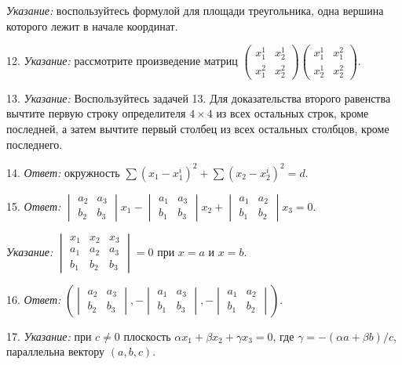 	\textit{Указание:} воспользуйтесь формулой для площади треугольника, одна вершина которого лежит в начале координат.

	12. \textit{Указание:} рассмотрите произведение матриц $\begin{pmatrix} x^1_1 & x^1_2 \\ x^2_1 & x^2_2 \end{pmatrix} \begin{pmatrix} x^1_1 & x^2_1 \\ x^1_2 & x^2_2 \end{pmatrix}$.

	13. \textit{Указание:} Воспользуйтесь задачей 13. Для доказательства второго равенства вычтите первую строку определителя $4 \times 4$ из всех остальных строк, кроме последней, а затем вычтите первый столбец из всех остальных столбцов, кроме последнего.

	14. \textit{Ответ:} окружность $\sum (x_1 - x^i_1)^2 + \sum (x_2 - x^i_2)^2 = d$.

	15. \textit{Ответ:} $\begin{vmatrix} a_2 & a_3 \\ b_2 & b_3 \end{vmatrix} x_1 - \begin{vmatrix} a_1 & a_3 \\ b_1 & b_3 \end{vmatrix} x_2 + \begin{vmatrix} a_1 & a_2 \\ b_1 & b_2 \end{vmatrix} x_3 = 0$.

	\textit{Указание:} $\begin{vmatrix} x_1 & x_2 & x_3 \\ a_1 & a_2 & a_3 \\ b_1 & b_2 & b_3 \end{vmatrix} = 0$ при $x = a$ и $x = b$.

	16. \textit{Ответ:} $\left( \begin{vmatrix} a_2 & a_3 \\ b_2 & b_3 \end{vmatrix}, -\begin{vmatrix} a_1 & a_3 \\ b_1 & b_3 \end{vmatrix}, -\begin{vmatrix} a_1 & a_2 \\ b_1 & b_2 \end{vmatrix} \right)$.

	17. \textit{Указание:} при $c \ne 0$ плоскость $\alpha x_1 + \beta x_2 + \gamma x_3 = 0$, где $\gamma = -(\alpha a + \beta b)/c$, параллельна вектору $(a, b, c)$.

